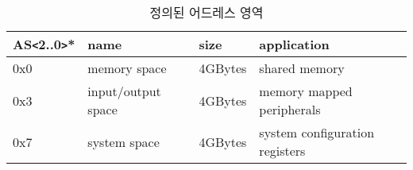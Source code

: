 %
%
\begin{table}[htbp]
\caption{정의된 어드레스 영역}
   \begin{center}
   \begin{tabular}{|l|l|l|l|} \hline
      AS{\tt <}2..0{\tt >}* & name & size & application \\ \hline \hline
      0x0 & memory space & 4GBytes & shared memory \\ \hline
      0x3 & input/output space & 4GBytes & memory mapped peripherals\\ \hline
      0x7 & system space & 4GBytes & system configuration registers\\ \hline
   \end{tabular}
   \end{center}
\end{table}
%
%
